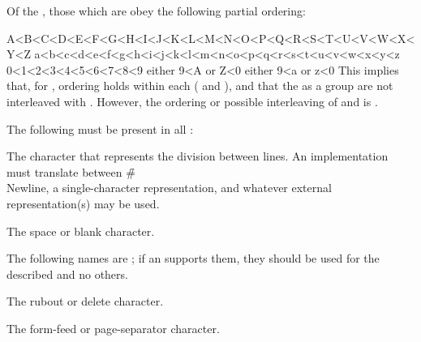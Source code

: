 \endlist

Of the , 
those which are  obey the following partial ordering:

\code
 A<B<C<D<E<F<G<H<I<J<K<L<M<N<O<P<Q<R<S<T<U<V<W<X<Y<Z
 a<b<c<d<e<f<g<h<i<j<k<l<m<n<o<p<q<r<s<t<u<v<w<x<y<z
 0<1<2<3<4<5<6<7<8<9
 either 9<A or Z<0
 either 9<a or z<0                                                      
\endcode
{}
This implies that, for ,  
ordering holds within each  ( and ), 
and that the   as a group are not interleaved
with  .
However, the ordering or possible interleaving of  
and   is .

\endsubSection%


The following   must be present in all 
:

\beginlist
{}

The character that represents the division between lines.
An implementation must translate between \f{\#\\Newline}, 
a single-character representation, and whatever external representation(s)
may be used.


The space or blank character.
\endlist

The following names are ; 
if an  supports them,
they should be used for the described  and no others.

\beginlist         
{}

The rubout or delete character.


The form-feed or page-separator character.

